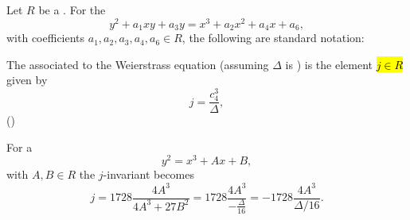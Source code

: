 \begin{definition} \label{definition:j_invariant_of_a_general_weierstrass_equation_with_invertible_discriminant}
    Let $R$ be a . 
    For the 
    $$ y^2 + a_1 x y + a_3 y = x^3 + a_2 x^2 + a_4 x + a_6, $$
    with coefficients $a_1,a_2,a_3,a_4,a_6 \in R$, the following are standard notation:
    
    The  associated to the Weierstrass equation (assuming $\Delta$ is ) is the element \hl{$j \in R$} given by
    $$ j = \frac{c_4^3}{\Delta}, $$
    ()
    
    For a 
    $$
    y^2 = x^3 + A x + B,
    $$
    with $A,B \in R$ the $j$-invariant becomes
    $$ j = 1728 \frac{4 A^3}{4 A^3 + 27 B^2} = 1728 \frac{4 A^3}{-\frac{\Delta}{16}} = -1728 \frac{4 A^3}{\Delta / 16}.  $$
\end{definition}
